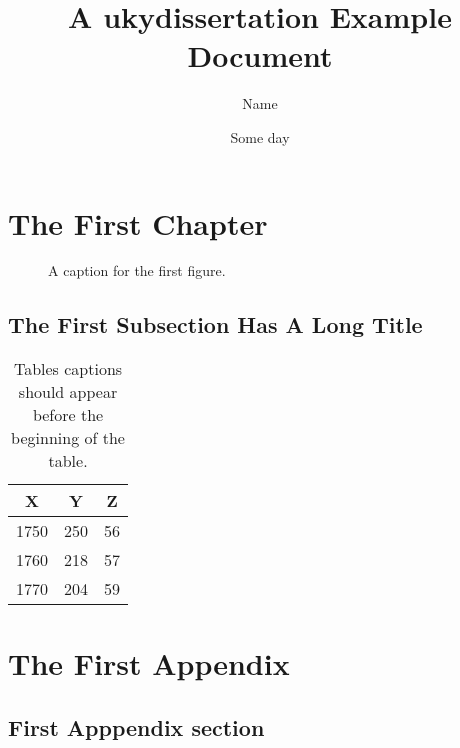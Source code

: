 \documentclass[endorse]{ukydissertation}
\title{A \textsf{ukydissertation} Example Document}
\author{Name}
\date{Some day}
\begin{document}
\makefrontmatter

\chapter{The First Chapter}
\lipsum[4-10]

\begin{figure}
  \centering
  \caption[A name for the ToC]{A caption for the first figure.}
  \label{fig:numberone}
\end{figure}

\section[A Shorter Title for ToC]
{The First Subsection Has A Long Title}

\lipsum[11]
\begin{table}
  \caption[A Short Table Title for the ToC]%
  {Tables captions should appear before the beginning of the table.}
  \vspace{\baselineskip}\centering
  \begin{tabular}{ccc}
    \hline
    X & Y & Z\\
    \hline
    1750 & 250 & 56\\
    1760 & 218 & 57\\
    1770 & 204 & 59\\
    \hline
  \end{tabular}
\end{table}
\lipsum[12-15]

\backmatter
\chapter{The First Appendix}
\lipsum[16-17]

\section{First Apppendix section}
\lipsum[18-22]



\vita
\lipsum[23-25]
\end{document}
